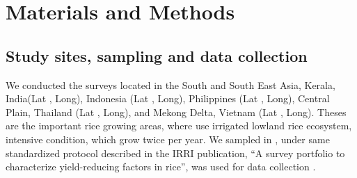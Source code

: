 \section*{Materials and Methods}

\subsection*{Study sites, sampling and data collection}
We conducted the surveys located in the South and South East Asia, Kerala, India(Lat , Long), Indonesia (Lat , Long), Philippines (Lat , Long), Central Plain, Thailand (Lat , Long), and Mekong Delta, Vietnam (Lat , Long). Theses are the important rice growing areas, where use irrigated lowland rice ecosystem, intensive condition, which grow twice per year. We sampled in , under same standardized protocol described in the IRRI publication, ``A survey portfolio to characterize yield-reducing factors in rice'', was used for data collection \cite{Savarysurvey2009}.